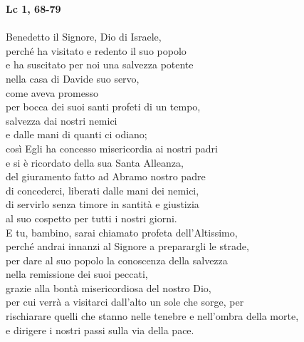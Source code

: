 \documentclass[landscape]{article}
\begin{document}
\begin{multicols}{2}
\textbf{Lc 1, 68-79}\\\\
\LARGE
\noindent Benedetto il Signore, Dio di Israele,\\
perché ha visitato e redento il suo popolo\\
e ha suscitato per noi una salvezza potente\\
nella casa di Davide suo servo,\\
come aveva promesso\\
per bocca dei suoi santi profeti di un tempo,\\
salvezza dai nostri nemici\\
e dalle mani di quanti ci odiano;\\
così Egli ha concesso misericordia ai nostri padri\\
e si è ricordato della sua Santa Alleanza,\\
del giuramento fatto ad Abramo nostro padre\\
di concederci, liberati dalle mani dei nemici,\\
di servirlo senza timore in santità e giustizia\\
al suo cospetto per tutti i nostri giorni.\\
E tu, bambino, sarai chiamato profeta dell'Altissimo,\\
perché andrai innanzi al Signore a preparargli le strade,\\
per dare al suo popolo la conoscenza della salvezza\\
nella remissione dei suoi peccati,\\
grazie alla bontà misericordiosa del nostro Dio,\\
per cui verrà a visitarci dall'alto un sole che sorge, per \\
rischiarare quelli che stanno nelle tenebre e nell'ombra della morte,\\
e dirigere i nostri passi sulla via della pace.\\

\end{multicols}
\end{document}
